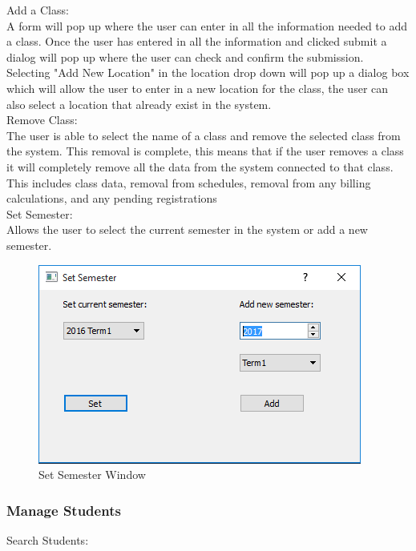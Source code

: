 Add a Class:\\
A form will pop up where the user can enter in all the information needed to add a class. Once the user has entered in all the information and clicked submit a dialog will pop up where the user can check and confirm the submission. Selecting "Add New Location" in the location drop down will pop up a dialog box which will allow the user to enter in a new location for the class, the user can also select a location that already exist in the system.\\

Remove Class:\\
The user is able to select the name of a class and remove the selected class from the system. This removal is complete, this means that if the user removes a class it will completely remove all the data from the system connected to that class. This includes class data, removal from schedules, removal from any billing calculations, and any pending registrations\\

Set Semester:\\
Allows the user to select the current semester in the system or add a new semester.

\begin{figure}
  \includegraphics[width=\linewidth]{pics/userGuide/setSemester.png}
  \caption{Set Semester Window}
  \label{fig:User doc: Set Semester}
\end{figure}

\subsubsection{Manage Students}

Search Students:\\

